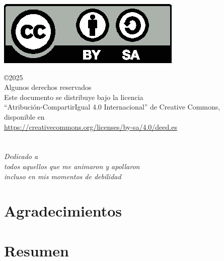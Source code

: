 \documentclass[a4paper, 12pt]{book}
\makeatletter
\let\theauthor\@author
\makeatother
\begin{document}
\begin{flushright}
	\includegraphics[scale=0.6]{img/by-sa}

	\noindent©2025 \theauthor  \\
	Algunos derechos reservados  \\
	Este documento se distribuye bajo la licencia \\
	``Atribución-CompartirIgual 4.0 Internacional'' de Creative Commons, \\
	disponible en \\
	\url{https://creativecommons.org/licenses/by-sa/4.0/deed.es}
\end{flushright}


\chapter*{}
\begin{flushright}
	\textit{Dedicado a \\
		todos aquellos que me animaron y apollaron \\
		incluso en mis momentos de debilidad}
\end{flushright}


\chapter*{Agradecimientos}



\chapter*{Resumen}
\end{document}
